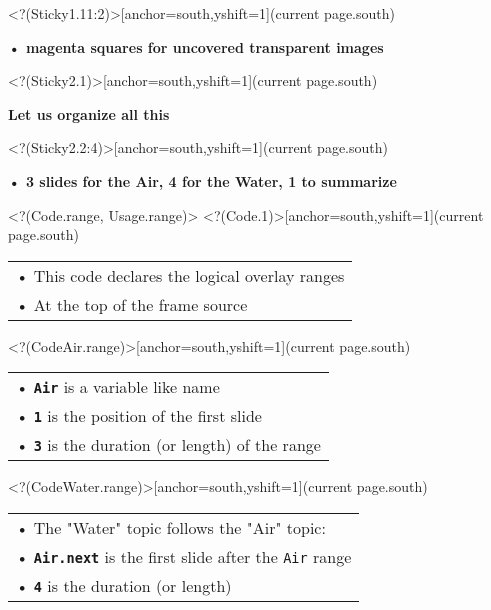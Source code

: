 \Sticky<?(Sticky1.11:2)>[anchor=south,yshift=1\baselineskip](current page.south){\begin{minipage}{0.85\textwidth}{\bfseries%
• magenta squares for uncovered transparent images
}\end{minipage}}%
\Sticky<?(Sticky2.1)>[anchor=south,yshift=1\baselineskip](current page.south){\begin{minipage}{0.75\textwidth}{\bfseries%
Let us organize all this
}\end{minipage}}%
\Sticky<?(Sticky2.2:4)>[anchor=south,yshift=1\baselineskip](current page.south){\begin{minipage}{0.85\textwidth}{\bfseries%
• 3 slides for the Air, 4 for the Water, 1 to summarize
}\end{minipage}}%
\visible<?(Code.range, Usage.range)> {%
}%
%
\Sticky<?(Code.1)>[anchor=south,yshift=1\baselineskip](current page.south){\bfseries\begin{tabular}{p{}}
• This code declares the logical overlay ranges\\
• At the top of the frame source
\end{tabular}}%
\Sticky<?(CodeAir.range)>[anchor=south,yshift=1\baselineskip](current page.south){\bfseries\begin{tabular}{p{}}
• \texttt{\bfseries{Air}} is a variable like name\\
• \texttt{\bfseries{1}} is the position of the first slide\\
• \texttt{\bfseries{3}} is the duration (or length) of the range
\end{tabular}}%
\Sticky<?(CodeWater.range)>[anchor=south,yshift=1\baselineskip](current page.south){\bfseries\begin{tabular}{p{}}
• The "Water" topic follows the "Air" topic:\\
• \texttt{\bfseries{Air.next}} is the first slide after the \texttt{Air} range\\
• \texttt{\bfseries{4}} is the duration (or length)
\end{tabular}}%
